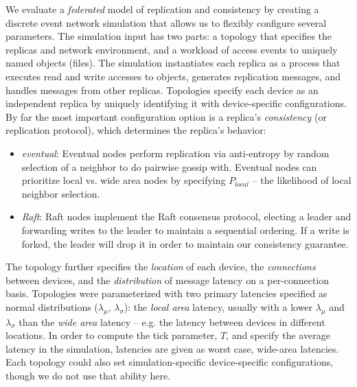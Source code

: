 \documentclass[10pt,conference,letterpaper]{IEEEtran}
\begin{document}

We evaluate a \emph{federated} model of replication and consistency by creating a
discrete event network simulation that allows us to flexibly configure several parameters.
The simulation input has two parts: a topology that specifies the replicas and
network environment, and a workload of access events to uniquely named objects
(files).
The simulation instantiates each replica as a process that executes read and
write accesses to objects, generates replication messages, and 
handles messages from other replicas.
Topologies specify each device as an independent replica by uniquely identifying it
with device-specific configurations.
By far the most important configuration option is a replica's \textit{consistency} (or replication
protocol), which determines the replica's behavior:
\begin{itemize}
    \item \emph{eventual}: Eventual nodes perform replication via anti-entropy by random
      selection of a neighbor to do pairwise gossip with. Eventual  nodes can prioritize
      local vs. wide area nodes by specifying $P_{local}$ -- the likelihood of local neighbor selection.
    \item \emph{Raft}: Raft nodes implement the Raft consensus protocol, electing a
      leader and forwarding writes to the leader to maintain a sequential  ordering. If a
      write is forked, the leader will drop it in order to maintain our consistency
      guarantee.
\end{itemize}

The topology further specifies the \textit{location} of each device, the
\textit{connections} between devices, and the \textit{distribution} of message latency on
a per-connection basis.
Topologies were parameterized with two primary latencies specified as normal distributions ($\lambda_{\mu}$,
$\lambda_{\sigma}$): the \textit{local area} latency, usually with a lower $\lambda_{\mu}$
and $\lambda_{\sigma}$ than the \textit{wide area} latency -- e.g.
the latency between devices in different locations.
In order to compute the tick parameter, $T$, and specify the average latency in the
simulation, latencies are given as worst case, wide-area latencies.
Each topology could also set simulation-specific device-specific configurations, though we
do not use that ability here.
\end{document}
